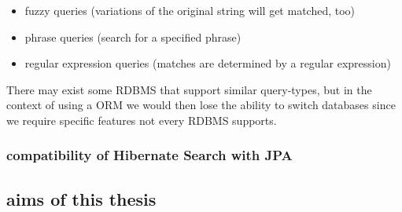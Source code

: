 \begin{itemize}
	\item fuzzy queries (variations of the original string will get matched, too)
	\item phrase queries (search for a specified phrase)
	\item regular expression queries (matches are determined by a regular expression)
\end{itemize}
There may exist some RDBMS that support similar query-types, but in the context of using a ORM we would then lose the ability to switch databases since we require specific features not every RDBMS supports.

\subsubsection{compatibility of Hibernate Search with JPA}

\subsection{aims of this thesis}
